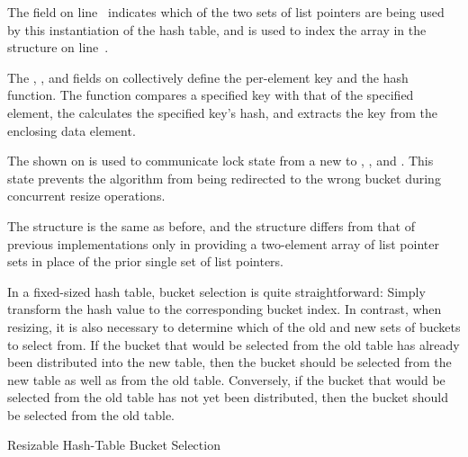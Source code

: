 \begin{fcvref}
The  field on
line~ indicates which of the two sets of
list pointers are being used by this instantiation of the hash table,
and is used to index the  array in the 
structure on line~.

The , , and  fields on
collectively define the per-element key and the hash function.
The  function compares a specified key with that of
the specified element,
the  calculates the specified key's hash,
and  extracts the key from the enclosing data
element.

The  shown on 
is used to communicate lock state from a new 
to , , and .
This state prevents the algorithm from being redirected to the wrong
bucket during concurrent resize operations.

The  structure is the same as before, and the
 structure differs from that of previous implementations
only in providing a two-element array of list pointer sets in place of
the prior single set of list pointers.

In a fixed-sized hash table, bucket selection is quite straightforward:
Simply transform the hash value to the corresponding bucket index.
In contrast, when resizing, it is also necessary to determine which
of the old and new sets of buckets to select from.
If the bucket that would be selected from the old table has already
been distributed into the new table, then the bucket should be selected
from the new table as well as from the old table.
Conversely, if the bucket that would be selected from the old table
has not yet been distributed, then the bucket should be selected from
the old table.
\end{fcvref}

\begin{listing}[tb]

\caption{Resizable Hash-Table Bucket Selection}
\label{lst:datastruct:Resizable Hash-Table Bucket Selection}
\end{listing}

